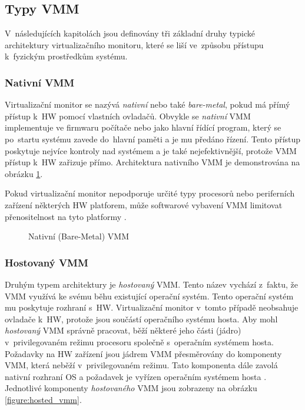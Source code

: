 \subsection{Typy VMM}
\label{chapter:virtualization:vmm:types}
V~následujících kapitolách jsou definovány tři základní druhy typické architektury virtualizačního monitoru, které se liší ve~způsobu
přístupu k~fyzickým prostředkům systému.
\subsubsection{Nativní VMM}
\label{chapter:virtualization:vmm:types:native}
Virtualizační monitor se nazývá \textit{nativní} nebo také \textit{bare-metal}, pokud má přímý přístup k~HW pomocí vlastních ovladačů.
Obvykle se \textit{nativní} VMM implementuje ve firmwaru počítače nebo jako hlavní řídící program, který se po~startu systému
zavede do~hlavní paměti a je mu předáno řízení. Tento přístup poskytuje nejvíce kontroly nad systémem a je také nejefektivnější,
protože VMM přístup k~HW zařizuje přímo. Architektura nativního VMM je demonstrována na obrázku \ref{figure:native_vmm}.

Pokud virtualizační monitor nepodporuje určité typy procesorů nebo periferních zařízení některých HW platforem, může softwarové
vybavení VMM limitovat přenositelnost na tyto platformy \cite{cvut:presentation:virt1}.
\begin{figure}
    \centering    
    \caption{Nativní (Bare-Metal) VMM}
    \label{figure:native_vmm}
\end{figure}
\subsubsection{Hostovaný VMM}
\label{chapter:virtualization:vmm:types:hosted}
Druhým typem architektury je \textit{hostovaný} VMM. Tento název vychází z~faktu, že VMM využívá ke svému běhu existující operační
systém. Tento operační systém mu poskytuje rozhraní s~HW. Virtualizační monitor v~tomto případě neobsahuje ovladače k~HW,
protože jsou součástí operačního systému hosta. Aby mohl \textit{hostovaný} VMM správně pracovat, běží některé jeho části (jádro)
v~privilegovaném režimu procesoru společně s~operačním systémem hosta. Požadavky na HW zařízení jsou jádrem VMM přesměrovány
do komponenty VMM, která neběží v~privilegovaném režimu. Tato komponenta dále zavolá nativní rozhraní OS a požadavek je 
vyřízen operačním systémem hosta \cite{cvut:presentation:virt1}. Jednotlivé komponenty \textit{hostovaného} VMM jsou zobrazeny na 
obrázku \ref{figure:hosted_vmm}.

